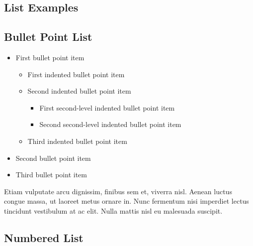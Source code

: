 
\begin{fullwidth}
    \section{List Examples}

    \subsection{Bullet Point List}

    \begin{itemize}
        \item First bullet point item
        \begin{itemize}
            \item First indented bullet point item
            \item Second indented bullet point item
            \begin{itemize}
                \item First second-level indented bullet point item
                \item Second second-level indented bullet point item
            \end{itemize}
            \item Third indented bullet point item
        \end{itemize}
        \item Second bullet point item
        \item Third bullet point item
    \end{itemize}

    Etiam vulputate arcu dignissim, finibus sem et, viverra nisl. Aenean luctus congue massa, ut laoreet metus ornare in. Nunc fermentum nisi imperdiet lectus tincidunt vestibulum at ac elit. Nulla mattis nisl eu malesuada suscipit.


    \subsection{Numbered List}


\end{fullwidth}
